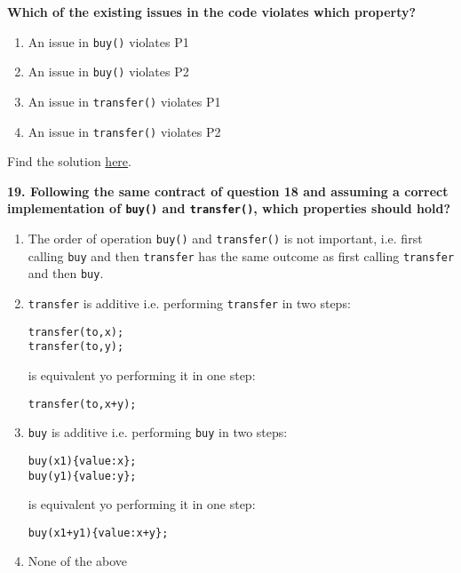 \textbf{Which of the existing issues in the code violates which property?}

\begin{enumerate}[label=\Alph*.]
    \item An issue in \verb|buy()| violates P1
    \item An issue in \verb|buy()| violates P2
    \item An issue in \verb|transfer()| violates P1
    \item An issue in \verb|transfer()| violates P2
\end{enumerate}

Find the solution \hyperref[sec:raceXcertora_q18]{here}.\\

\pagebreak

\textbf{19. Following the same contract of question 18 and assuming a correct implementation of \texttt{buy()} and \texttt{transfer()}, which properties should hold?}

\begin{enumerate}[label=\Alph*.]
    \item The order of operation \verb|buy()| and \verb|transfer()| is not important, i.e. first calling \verb|buy| and then \verb|transfer| has the same outcome as first calling \verb|transfer| and then \verb|buy|.
    \item\verb|transfer| is additive i.e. performing \verb|transfer| in two steps:
        \begin{lstlisting}[language=Solidity, style=solStyle]
transfer(to,x);
transfer(to,y);
\end{lstlisting}
        is equivalent yo performing it in one step:
        \begin{lstlisting}[language=Solidity, style=solStyle]
transfer(to,x+y);
\end{lstlisting}
    \item\verb|buy| is additive i.e. performing \verb|buy| in two steps:
        \begin{lstlisting}[language=Solidity, style=solStyle]
buy(x1){value:x};
buy(y1){value:y};
\end{lstlisting}
        is equivalent yo performing it in one step:
        \begin{lstlisting}[language=Solidity, style=solStyle]
buy(x1+y1){value:x+y};
\end{lstlisting}
    \item None of the above
\end{enumerate}

